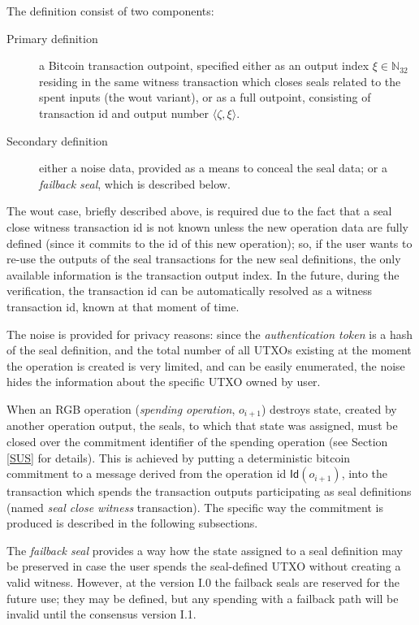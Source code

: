 \documentclass[9pt,oneside]{amsart}
\begin{document}
\begin{multicols}{2}
The definition consist of two components:
\begin{description}
\item[Primary definition] a Bitcoin transaction outpoint, specified either
    as an output index $\xi \in \mathbb{N}_{32}$ residing in the same witness transaction
    which closes seals related to the spent inputs (the \textsf{wout} variant),
    or as a full outpoint, consisting of transaction id and output number
    $\langle \zeta, \xi\rangle$.
\item[Secondary definition] either a noise data, provided as a means to conceal
    the seal data; or a \emph{failback seal}, which is described below.
\end{description}

The \textsf{wout} case, briefly described above, is required due to the fact that
a seal close witness transaction id is not known unless the new operation data are fully defined
(since it commits to the id of this new operation);
so, if the user wants to re-use the outputs of the seal transactions for the new seal
definitions, the only available information is the transaction output index.
In the future, during the verification, the transaction id can be automatically resolved
as a witness transaction id, known at that moment of time.

The noise is provided for privacy reasons:
since the \emph{authentication token} is a hash of the seal definition,
and the total number of all UTXOs existing at the moment the operation is created is very limited,
and can be easily enumerated, the noise hides the information about the specific UTXO owned by user.

When an RGB operation (\emph{spending operation}, $o_{i+1}$) destroys state,
created by another operation output, the seals, to which that state was assigned,
must be closed over the commitment identifier of the spending operation
(see Section \ref{SUS} for details).
This is achieved by putting a deterministic bitcoin commitment to
a message derived from the operation id $\mathsf{Id}(o_{i+1})$,
into the transaction which spends the transaction outputs participating as seal definitions
(named \emph{seal close witness} transaction).
The specific way the commitment is produced is described in the following subsections.

The \emph{failback seal} provides a way how the state assigned to a seal definition
may be preserved in case the user spends the seal-defined UTXO without creating a valid witness.
However, at the version I.0 the failback seals are reserved for the future use;
they may be defined, but any spending with a failback path will be invalid
until the consensus version I.1.


\end{multicols}
\end{document}
